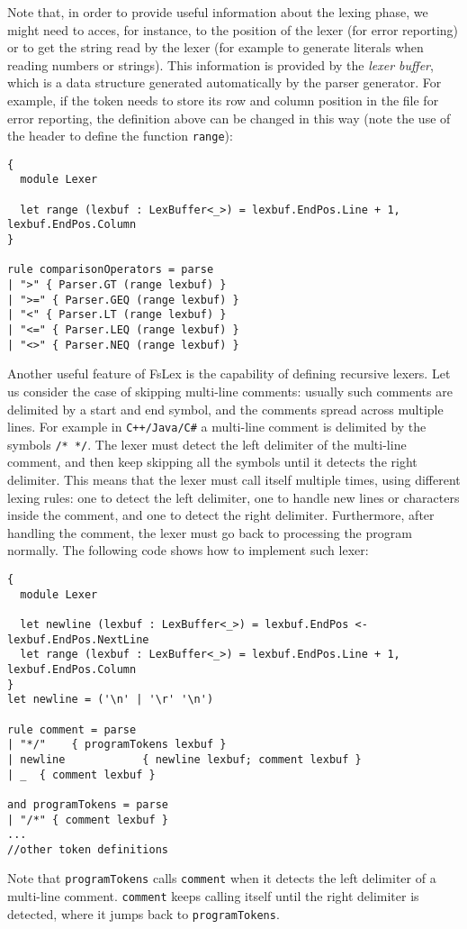 Note that, in order to provide useful information about the lexing phase, we might need to acces, for instance, to the position of the lexer (for error reporting) or to get the string read by the lexer (for example to generate literals when reading numbers or strings). This information is provided by the \textit{lexer buffer}, which is a data structure generated automatically by the parser generator. For example, if the token needs to store its row and column position in the file for error reporting, the definition above can be changed in this way (note the use of the header to define the function \texttt{range}):


\begin{lstlisting}
{
  module Lexer
  
  let range (lexbuf : LexBuffer<_>) = lexbuf.EndPos.Line + 1, lexbuf.EndPos.Column
}

rule comparisonOperators = parse
| ">" { Parser.GT (range lexbuf) }
| ">=" { Parser.GEQ (range lexbuf) }
| "<" { Parser.LT (range lexbuf) }
| "<=" { Parser.LEQ (range lexbuf) }
| "<>" { Parser.NEQ (range lexbuf) }
\end{lstlisting}

Another useful feature of FsLex is the capability of defining recursive lexers. Let us consider the case of skipping multi-line comments: usually such comments are delimited by a start and end symbol, and the comments spread across multiple lines. For example in \texttt{C++/Java/C\#} a multi-line comment is delimited by the symbols \texttt{/* */}. The lexer must detect the left delimiter of the multi-line comment, and then keep skipping all the symbols until it detects the right delimiter. This means that the lexer must call itself multiple times, using different lexing rules: one to detect the left delimiter, one to handle new lines or characters inside the comment, and one to detect the right delimiter. Furthermore, after handling the comment, the lexer must go back to processing the program normally. The following code shows how to implement such lexer:

\begin{lstlisting}
{
  module Lexer
  
  let newline (lexbuf : LexBuffer<_>) = lexbuf.EndPos <- lexbuf.EndPos.NextLine
  let range (lexbuf : LexBuffer<_>) = lexbuf.EndPos.Line + 1, lexbuf.EndPos.Column
}
let newline = ('\n' | '\r' '\n')

rule comment = parse
| "*/"    { programTokens lexbuf }
| newline            { newline lexbuf; comment lexbuf }
| _  { comment lexbuf }

and programTokens = parse
| "/*" { comment lexbuf }
...
//other token definitions
\end{lstlisting}
Note that \texttt{programTokens} calls \texttt{comment} when it detects the left delimiter of a multi-line comment. \texttt{comment} keeps calling itself until the right delimiter is detected, where it jumps back to \texttt{programTokens}.

